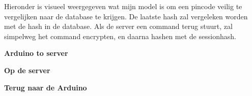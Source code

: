\documentclass{article}
\begin{document}
Hieronder is visueel weergegeven wat mijn model is om een pincode veilig te vergelijken naar de database te krijgen. De laatste hash zal vergeleken worden met de hash in de database.
Als de server een command terug stuurt, zal simpelweg het command encrypten, en daarna hashen met de sessionhash.

\hfill

\centerline{\textbf{Arduino to server} }

\vspace{1cm}

\centerline{\textbf{Op de server} }

\vspace{1cm}

\centerline{\textbf{Terug naar de Arduino} }
%
%
\end{document}
